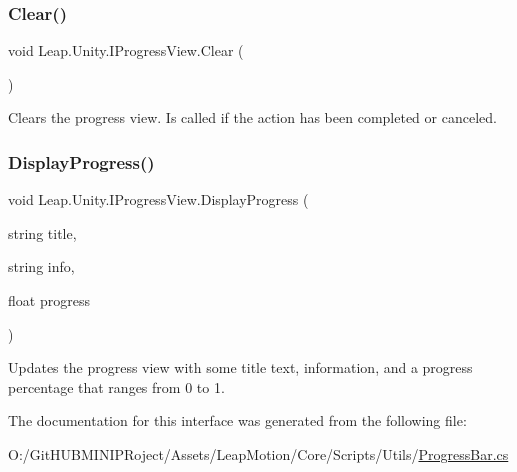 \subsubsection{\texorpdfstring{Clear()}{Clear()}}
{\footnotesize\ttfamily void Leap.\+Unity.\+I\+Progress\+View.\+Clear (\begin{DoxyParamCaption}{ }\end{DoxyParamCaption})}



Clears the progress view. Is called if the action has been completed or canceled. 

\mbox{\label{interface_leap_1_1_unity_1_1_i_progress_view_aaa6759b57d4c327ffc05da272ec5fe57}} 
\subsubsection{\texorpdfstring{DisplayProgress()}{DisplayProgress()}}
{\footnotesize\ttfamily void Leap.\+Unity.\+I\+Progress\+View.\+Display\+Progress (\begin{DoxyParamCaption}\item[{string}]{title,  }\item[{string}]{info,  }\item[{float}]{progress }\end{DoxyParamCaption})}



Updates the progress view with some title text, information, and a progress percentage that ranges from 0 to 1. 



The documentation for this interface was generated from the following file\+:\begin{DoxyCompactItemize}
\item 
O\+:/\+Git\+H\+U\+B\+M\+I\+N\+I\+P\+Roject/\+Assets/\+Leap\+Motion/\+Core/\+Scripts/\+Utils/\mbox{\hyperlink{_progress_bar_8cs}{Progress\+Bar.\+cs}}\end{DoxyCompactItemize}
